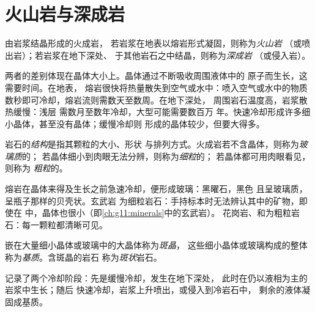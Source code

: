 \section{火山岩与深成岩}

\begin{definition}\label{def:g11:igneous-rocks:volcanic-plutonic}
由岩浆结晶形成的火成岩，
若岩浆在地表以熔岩形式凝固，则称为\emph{火山岩}
（或喷出岩）；若岩浆在地下深处、
于其他岩石之中结晶，则称为\emph{深成岩}
（或侵入岩）。
\end{definition}

两者的差别体现在晶体大小上。晶体通过不断吸收周围液体中的
原子而生长，这需要时间。在地表，
熔岩很快将热量散失到空气或水中：喷入空气或水中的物质
数秒即可冷却，熔岩流则需数天至数周。在地下深处，
周围岩石温度高，岩浆散热缓慢：浅层
需数月至数年冷却，大型可能需要数百万
年。快速冷却形成许多细小晶体，甚至没有晶体；缓慢冷却则
形成的晶体较少，但要大得多。

\begin{definition}[结构]\label{def:g11:igneous-rocks:texture}
岩石的\emph{结构}是指其颗粒的大小、形状
与排列方式。火成岩若不含晶体，则称为\emph{玻璃质}的；
若晶体细小到肉眼无法分辨，则称为\emph{细粒}的；
若晶体都可用肉眼看见，则称为
\emph{粗粒}的。
\end{definition}

熔岩在晶体来得及生长之前急速冷却，便形成玻璃：黑曜石，黑色
且呈玻璃质，呈瓶子那样的贝壳状。玄武岩
为细粒岩石：手持标本时无法辨认其中的矿物，即使在
中，晶体也很小（即\cref{ch:g11:minerals}中的玄武岩）。
花岗岩、和为粗粒岩石：每一颗粒都清晰可见。

\begin{definition}[斑晶；斑状]\label{def:g11:igneous-rocks:porphyritic}
嵌在大量细小晶体或玻璃中的大晶体称为\emph{斑晶}，
这些细小晶体或玻璃构成的整体称为\emph{基质}。含斑晶的岩石
称为\emph{斑状}岩石。
\end{definition}

记录了两个冷却阶段：先是缓慢冷却，发生在地下深处，
此时在仍以液相为主的岩浆中生长；随后
快速冷却，岩浆上升喷出，或侵入到冷岩石中，
剩余的液体凝固成基质。

